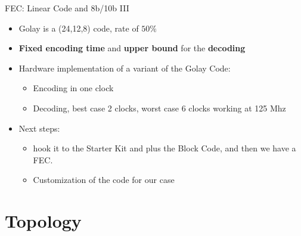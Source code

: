 \documentclass[compress,red]{beamer}
\begin{document}
\begin{frame}{FEC: Linear Code and 8b/10b III}
    \begin{itemize}
        \item Golay is a (24,12,8) code, rate of $50\%$ 
        \item \textbf{Fixed encoding time} and \textbf{upper bound} for the
        \textbf{decoding}
        \item Hardware implementation of a variant of the Golay Code:
            \begin{itemize}
                \item Encoding in one clock
                \item Decoding, best case 2 clocks, worst case 6 clocks working
                at 125 Mhz 
            \end{itemize}
        \item Next steps: 
            \begin{itemize}
                \item hook it to the Starter Kit and plus the Block Code,
                and then we have a FEC.
                \item Customization of the code for our case 
            \end{itemize}
    \end{itemize}
\end{frame}
\section{Topology}
\end{document}
